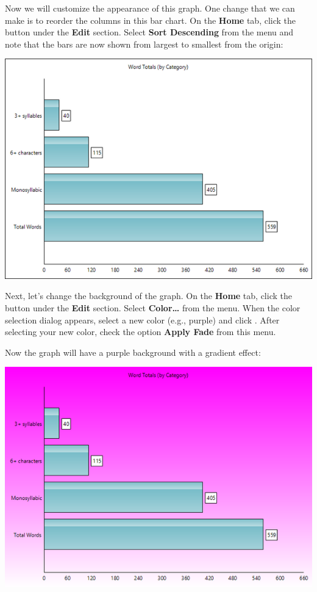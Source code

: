\documentclass[
]{book}
\theoremstyle{definition}
\theoremstyle{definition}
\theoremstyle{definition}
\theoremstyle{definition}
\theoremstyle{remark}
\begin{document}
Now we will customize the appearance of this graph. One change that we can make is to reorder the columns in this bar chart. On the \textbf{Home} tab, click the  button under the \textbf{Edit} section. Select \textbf{Sort Descending} from the menu and note that the bars are now shown from largest to smallest from the origin:

\begin{center}\includegraphics[width=0.75\linewidth,]{Images/ExampleGraphSorted} \end{center}

Next, let's change the background of the graph. On the \textbf{Home} tab, click the  button under the \textbf{Edit} section. Select \textbf{Color\ldots{}} from the menu. When the color selection dialog appears, select a new color (e.g., purple) and click . After selecting your new color, check the option \textbf{Apply Fade} from this menu.

Now the graph will have a purple background with a gradient effect:

\begin{center}\includegraphics[width=0.75\linewidth,]{Images/ExampleGraphBackgroundColorChanged} \end{center}
\end{document}

